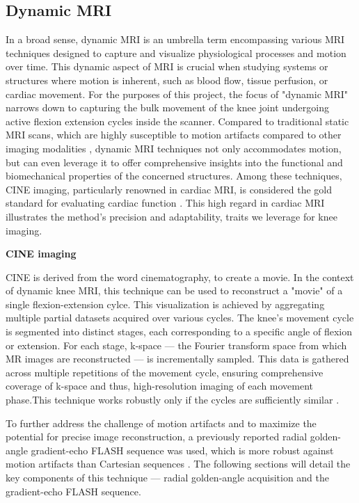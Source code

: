\documentclass{micro-econ-thesis}
\begin{document}
\subsection{Dynamic MRI}
In a broad sense, dynamic MRI is an umbrella term encompassing various MRI techniques designed to capture and visualize physiological processes and motion over time. This dynamic aspect of MRI is crucial when studying systems or structures where motion is inherent, such as blood flow, tissue perfusion, or cardiac movement. For the purposes of this project, the focus of "dynamic MRI" narrows down to capturing the bulk movement of the knee joint undergoing active flexion extension cycles inside the scanner. Compared to traditional static MRI scans, which are highly susceptible to motion artifacts compared to other imaging modalities \parencite{zaitsev_motion_2015}, dynamic MRI techniques not only accommodates motion, but can even leverage it to offer comprehensive insights into the functional and biomechanical properties of the concerned structures.  Among these techniques, CINE imaging, particularly renowned in cardiac MRI, is considered the gold standard for evaluating cardiac function \parencite{menchon-lara_reconstruction_2019}. This high regard in cardiac MRI illustrates the method's precision and adaptability, traits we leverage for knee imaging.

\textbf{CINE imaging}

CINE is derived from the word cinematography, to create a movie. In the context of dynamic knee MRI, this technique can be used to reconstruct a "movie" of a single flexion-extension cylce. This visualization is achieved by aggregating multiple partial datasets acquired over various cycles. The knee's movement cycle is segmented into distinct stages, each corresponding to a specific angle of flexion or extension. For each stage, k-space — the Fourier transform space from which MR images are reconstructed — is incrementally sampled. This data is gathered across multiple repetitions of the movement cycle, ensuring comprehensive coverage of k-space and thus, high-resolution imaging of each movement phase.This technique works robustly only if the cycles are sufficiently similar \parencite{curtis_primer_2022}.
  
To further address the challenge of motion artifacts and to maximize the potential for precise image reconstruction, a previously reported radial golden-angle gradient-echo FLASH sequence was used, which is more robust against motion artifacts than Cartesian sequences \parencite{aleksiev_high-resolution_2022}. The following sections will detail the key components of this technique — radial golden-angle acquisition and the gradient-echo FLASH sequence.
\end{document}
